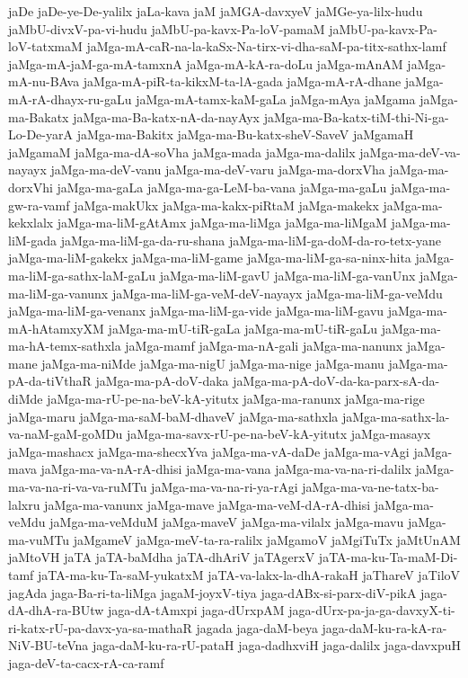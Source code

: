 {jaDe
jaDe-ye-De-yalilx
jaLa-kava
jaM
jaMGA-davxyeV
jaMGe-ya-lilx-hudu
jaMbU-divxV-pa-vi-hudu
jaMbU-pa-kavx-Pa-loV-pamaM
jaMbU-pa-kavx-Pa-loV-tatxmaM
jaMga-mA-caR-na-la-kaSx-Na-tirx-vi-dha-saM-pa-titx-sathx-lamf
jaMga-mA-jaM-ga-mA-tamxnA
jaMga-mA-kA-ra-doLu
jaMga-mAnAM
jaMga-mA-nu-BAva
jaMga-mA-piR-ta-kikxM-ta-lA-gada
jaMga-mA-rA-dhane
jaMga-mA-rA-dhayx-ru-gaLu
jaMga-mA-tamx-kaM-gaLa
jaMga-mAya
jaMgama
jaMga-ma-Bakatx
jaMga-ma-Ba-katx-nA-da-nayAyx
jaMga-ma-Ba-katx-tiM-thi-Ni-ga-Lo-De-yarA
jaMga-ma-Bakitx
jaMga-ma-Bu-katx-sheV-SaveV
jaMgamaH
jaMgamaM
jaMga-ma-dA-soVha
jaMga-mada
jaMga-ma-dalilx
jaMga-ma-deV-va-nayayx
jaMga-ma-deV-vanu
jaMga-ma-deV-varu
jaMga-ma-dorxVha
jaMga-ma-dorxVhi
jaMga-ma-gaLa
jaMga-ma-ga-LeM-ba-vana
jaMga-ma-gaLu
jaMga-ma-gw-ra-vamf
jaMga-makUkx
jaMga-ma-kakx-piRtaM
jaMga-makekx
jaMga-ma-kekxlalx
jaMga-ma-liM-gAtAmx
jaMga-ma-liMga
jaMga-ma-liMgaM
jaMga-ma-liM-gada
jaMga-ma-liM-ga-da-ru-shana
jaMga-ma-liM-ga-doM-da-ro-tetx-yane
jaMga-ma-liM-gakekx
jaMga-ma-liM-game
jaMga-ma-liM-ga-sa-ninx-hita
jaMga-ma-liM-ga-sathx-laM-gaLu
jaMga-ma-liM-gavU
jaMga-ma-liM-ga-vanUnx
jaMga-ma-liM-ga-vanunx
jaMga-ma-liM-ga-veM-deV-nayayx
jaMga-ma-liM-ga-veMdu
jaMga-ma-liM-ga-venanx
jaMga-ma-liM-ga-vide
jaMga-ma-liM-gavu
jaMga-ma-mA-hAtamxyXM
jaMga-ma-mU-tiR-gaLa
jaMga-ma-mU-tiR-gaLu
jaMga-ma-ma-hA-temx-sathxla
jaMga-mamf
jaMga-ma-nA-gali
jaMga-ma-nanunx
jaMga-mane
jaMga-ma-niMde
jaMga-ma-nigU
jaMga-ma-nige
jaMga-manu
jaMga-ma-pA-da-tiVthaR
jaMga-ma-pA-doV-daka
jaMga-ma-pA-doV-da-ka-parx-sA-da-diMde
jaMga-ma-rU-pe-na-beV-kA-yitutx
jaMga-ma-ranunx
jaMga-ma-rige
jaMga-maru
jaMga-ma-saM-baM-dhaveV
jaMga-ma-sathxla
jaMga-ma-sathx-la-va-naM-gaM-goMDu
jaMga-ma-savx-rU-pe-na-beV-kA-yitutx
jaMga-masayx
jaMga-mashacx
jaMga-ma-shecxYva
jaMga-ma-vA-daDe
jaMga-ma-vAgi
jaMga-mava
jaMga-ma-va-nA-rA-dhisi
jaMga-ma-vana
jaMga-ma-va-na-ri-dalilx
jaMga-ma-va-na-ri-va-va-ruMTu
jaMga-ma-va-na-ri-ya-rAgi
jaMga-ma-va-ne-tatx-ba-lalxru
jaMga-ma-vanunx
jaMga-mave
jaMga-ma-veM-dA-rA-dhisi
jaMga-ma-veMdu
jaMga-ma-veMduM
jaMga-maveV
jaMga-ma-vilalx
jaMga-mavu
jaMga-ma-vuMTu
jaMgameV
jaMga-meV-ta-ra-ralilx
jaMgamoV
jaMgiTuTx
jaMtUnAM
jaMtoVH
jaTA
jaTA-baMdha
jaTA-dhAriV
jaTAgerxV
jaTA-ma-ku-Ta-maM-Di-tamf
jaTA-ma-ku-Ta-saM-yukatxM
jaTA-va-lakx-la-dhA-rakaH
jaThareV
jaTiloV
jagAda
jaga-Ba-ri-ta-liMga
jagaM-joyxV-tiya
jaga-dABx-si-parx-diV-pikA
jaga-dA-dhA-ra-BUtw
jaga-dA-tAmxpi
jaga-dUrxpAM
jaga-dUrx-pa-ja-ga-davxyX-ti-ri-katx-rU-pa-davx-ya-sa-mathaR
jagada
jaga-daM-beya
jaga-daM-ku-ra-kA-ra-NiV-BU-teVna
jaga-daM-ku-ra-rU-pataH
jaga-dadhxviH
jaga-dalilx
jaga-davxpuH
jaga-deV-ta-cacx-rA-ca-ramf
}
